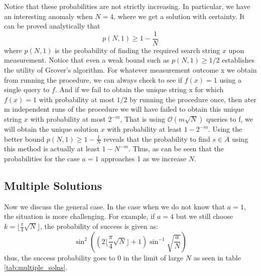 \documentclass[12pt, oneside]{book}
\theoremstyle{definition}
\theoremstyle{definition}
\theoremstyle{remark}
\begin{document}
Notice that these probabilities are not strictly increasing. In particular, we have an interesting anomaly when $N=4$, where we get a solution with certainty. It can be proved analytically that
\[
p(N,1)\geq 1-\dfrac{1}{N}
\]
where $p(N,1)$ is the probability of finding the required search string $x$ upon measurement. Notice that even a weak bound such as $p(N,1)\geq 1/2$ establishes the utility of Grover's algorithm. For whatever measurement outcome x we obtain from running the procedure, we can always check to see if $f(x)=1$ using a single query to $f$. And if we fail to obtain the unique string x for which $f(x)=1$ with probability at most $1/2$ by running the procedure once, then ater m independent runs of the procedure we will have failed to obtain this unique string $x$ with probability at most $2^{-m}$, That is using $\mathcal{O}(m\sqrt{N})$ queries to f, we will obtain the unique solution $x$ with probability at least $1-2^{-m}$. Using the better bound $p(N,1) \geq 1-\frac{1}{N}$ reveals that the probability to find $s \in A$ using this method is actually at least $1-N^{-m}$. Thus, as can be seen that the probabilities for the case $a=1$ approaches 1 as we increase $N$.

\subsection{Multiple Solutions}
Now we discuss the general case. In the case when we do not know that $a=1$, the situation is more challenging. For example, if $a=4$ but we still choose $k=\lfloor \frac{\pi}{4}\sqrt{N}\rfloor$, the probability of success is given as: 
\[
\sin^2 \left(\left(2\lfloor \frac{\pi}{4}\sqrt{N} \rfloor+1\right)\sin^{-1} \sqrt{\frac{a}{N}}\right)
\]
thus, the success probability goes to 0 in the limit of large $N$ as seen in table \ref{tab:multiple_solns}.
\end{document}
